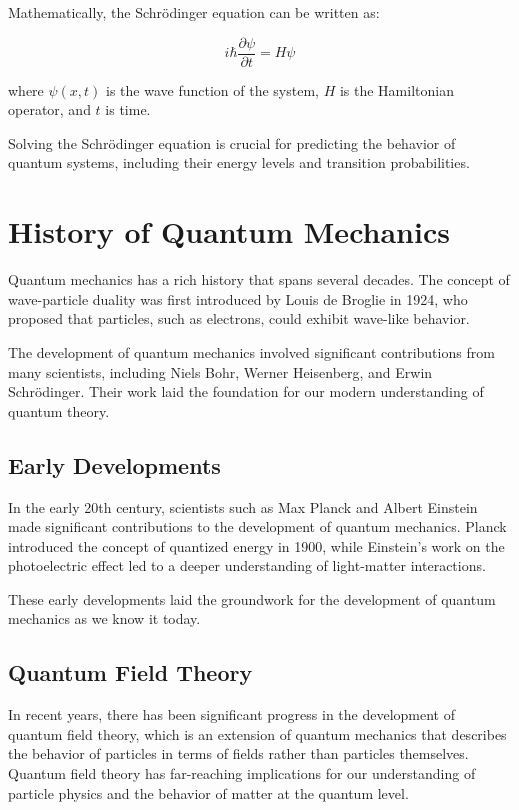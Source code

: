 Mathematically, the Schrödinger equation can be written as:

\[
i\hbar \frac{\partial \psi}{\partial t} = H \psi
\]

where $\psi(x,t)$ is the wave function of the system, $H$ is the Hamiltonian operator, and $t$ is time.

Solving the Schrödinger equation is crucial for predicting the behavior of quantum systems, including their energy levels and transition probabilities.

\section*{History of Quantum Mechanics}

Quantum mechanics has a rich history that spans several decades. The concept of wave-particle duality was first introduced by Louis de Broglie in 1924, who proposed that particles, such as electrons, could exhibit wave-like behavior.

The development of quantum mechanics involved significant contributions from many scientists, including Niels Bohr, Werner Heisenberg, and Erwin Schrödinger. Their work laid the foundation for our modern understanding of quantum theory.

\subsection*{Early Developments}

In the early 20th century, scientists such as Max Planck and Albert Einstein made significant contributions to the development of quantum mechanics. Planck introduced the concept of quantized energy in 1900, while Einstein's work on the photoelectric effect led to a deeper understanding of light-matter interactions.

These early developments laid the groundwork for the development of quantum mechanics as we know it today.

\subsection*{Quantum Field Theory}

In recent years, there has been significant progress in the development of quantum field theory, which is an extension of quantum mechanics that describes the behavior of particles in terms of fields rather than particles themselves. Quantum field theory has far-reaching implications for our understanding of particle physics and the behavior of matter at the quantum level.

